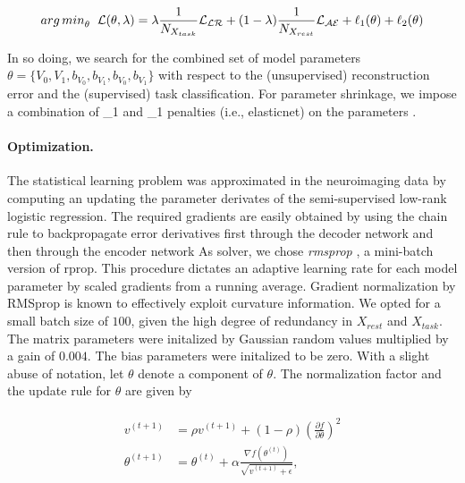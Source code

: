 \documentclass{article} %
\begin{document}
\begin{eqnarray}
  \begin{split}
{arg\,min}_\theta \hspace{0.2cm} {\mathcal{L}}(\theta, \lambda) = \lambda\frac{1}{N_{X_{task}}} {\mathcal{L_{LR}}}
+ (1-\lambda)\frac{1}{N_{X_{rest}}} {\mathcal{L_{AE}}} + \ell_1(\theta) + \ell_2(\theta)
  \label{eq:loss_equ}
\end{split}
\end{eqnarray}

In so doing, we search for the combined set of model parameters
$\theta=\{V_0,V_1,b_{V_0}, b_{V_1}, b_{V_0}, b_{V_1}\}$
with respect to the (unsupervised) reconstruction error and the
(supervised) task classification. For parameter shrinkage, we
impose a combination of \ell_1 and \ell_1 penalties (i.e., elasticnet)
on the parameters \theta.

\paragraph{Optimization.}
The statistical learning problem was approximated in the neuroimaging data
by computing an updating the parameter derivates of the 
semi-supervised low-rank logistic regression.
The required gradients are easily obtained by using the chain rule to
backpropagate error derivatives first through the decoder network
and then through the encoder network 
As solver, we chose \textit{rmsprop} \cite{rmsprop},
a mini-batch version of rprop.
This procedure dictates an adaptive learning rate
for each model parameter by
scaled gradients from a running average.
Gradient normalization by RMSprop
is known to effectively exploit curvature information.
We opted for a small batch size of $100$, given the high degree of
redundancy in $X_{rest}$ and $X_{task}$.
The matrix parameters were initalized by Gaussian random values multiplied
by a gain of $0.004$. The bias parameters were initalized to be zero.
With a slight abuse of notation, let $\theta$ denote a component of $\theta$.
The normalization factor and the update rule for $\theta$
are given by

\begin{eqnarray}
  \begin{split}
v^{(t+1)} &= \rho v^{(t+1)} + (1 - \rho)\left(\frac{\partial f}{\partial \theta}\right)^2
\\
\theta^{(t+1)} &= \theta^{(t)} + \alpha \frac{\nabla f(\theta^{(t)})}{\sqrt{v^{(t+1)} + \epsilon}},
  \end{split}
\end{eqnarray}
\end{document}
